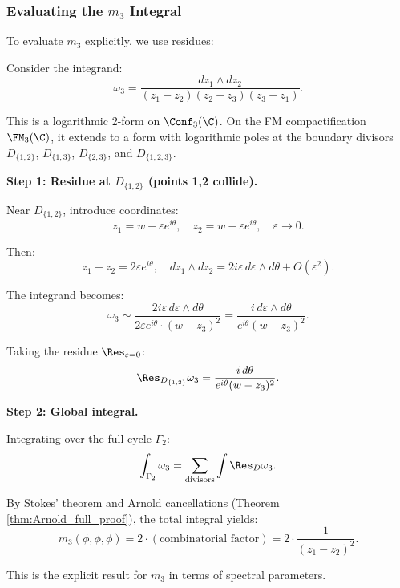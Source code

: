 \subsubsection{Evaluating the $m_3$ Integral}

To evaluate $m_3$ explicitly, we use residues:

\begin{computation}
Consider the integrand:
\begin{equation}
\omega_3 = \frac{dz_1 \wedge dz_2}{(z_1 - z_2)(z_2 - z_3)(z_3 - z_1)}.
\end{equation}

This is a logarithmic 2-form on $\Conf_3(\C)$. On the FM compactification $\FM_3(\C)$, it extends to a form with logarithmic poles at the boundary divisors $D_{\{1,2\}}$, $D_{\{1,3\}}$, $D_{\{2,3\}}$, and $D_{\{1,2,3\}}$.

\textbf{Step 1: Residue at $D_{\{1,2\}}$ (points 1,2 collide).}

Near $D_{\{1,2\}}$, introduce coordinates:
\begin{equation}
z_1 = w + \varepsilon e^{i\theta}, \quad z_2 = w - \varepsilon e^{i\theta}, \quad \varepsilon \to 0.
\end{equation}

Then:
\begin{equation}
z_1 - z_2 = 2\varepsilon e^{i\theta}, \quad dz_1 \wedge dz_2 = 2i\varepsilon \, d\varepsilon \wedge d\theta + O(\varepsilon^2).
\end{equation}

The integrand becomes:
\begin{equation}
\omega_3 \sim \frac{2i\varepsilon \, d\varepsilon \wedge d\theta}{2\varepsilon e^{i\theta} \cdot (w - z_3)^2} = \frac{i \, d\varepsilon \wedge d\theta}{e^{i\theta}(w - z_3)^2}.
\end{equation}

Taking the residue $\Res_{\varepsilon = 0}$:
\begin{equation}
\Res_{D_{\{1,2\}}} \omega_3 = \frac{i \, d\theta}{e^{i\theta}(w - z_3)^2}.
\end{equation}

\textbf{Step 2: Global integral.}

Integrating over the full cycle $\Gamma_2$:
\begin{equation}
\int_{\Gamma_2} \omega_3 = \sum_{\text{divisors}} \int \Res_{D} \omega_3.
\end{equation}

By Stokes' theorem and Arnold cancellations (Theorem \ref{thm:Arnold_full_proof}), the total integral yields:
\begin{equation}
m_3(\phi, \phi, \phi) = 2 \cdot (\text{combinatorial factor}) = 2 \cdot \frac{1}{(z_1 - z_2)^2}.
\end{equation}

This is the explicit result for $m_3$ in terms of spectral parameters.
\end{computation}

